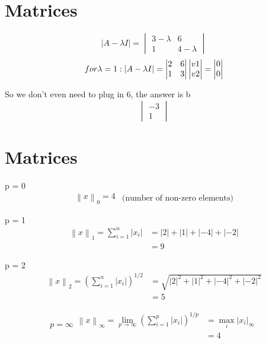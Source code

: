 \documentclass[paper=a4, fontsize=11pt]{scrartcl} %
\begin{document}
\section{Matrices}
    \[
\left | A - \lambda I \right | = \begin{vmatrix}
3-\lambda & 6\\ 
1 & 4-\lambda
\end{vmatrix}
    \]
    \[
for \space \lambda = 1:
\left | A - \lambda I \right | = \begin{vmatrix}
2 & 6\\ 
1 & 3
\end{vmatrix}
\begin{vmatrix}
v1\\
v2
\end{vmatrix}
=
\begin{vmatrix}
0\\
0
\end{vmatrix}
    \]
        
So we don't even need to plug in 6, the answer is b
    \[
\begin{vmatrix}
-3\\
1
\end{vmatrix}
    \]


\section{Matrices}

p = 0
\[
        \begin{split}
		\left \| x \right \|_0 = 4 
        \end{split}
        \begin{align*}
	        \text{(number of non-zero elements)}
        \end{align*}
\]

p = 1
\[
        \begin{split}
\left \| x \right \|_1 =  \sum_{i = 1}^{n} \left | x_i \right |
&= \left | 2 \right | + \left | 1 \right | + \left | -4 \right | + \left | -2 \right |
\\
&= 9
        \end{split}
\]

p = 2
\[
        \begin{split}
\left \| x \right \|_2 =  (\sum_{i = 1}^{n} \left | x_i \right |)^{\!1/2}
&= \sqrt{\left | 2 \right |^2 + \left | 1 \right |^2 + \left | -4 \right |^2 + \left | -2 \right |^2}
\\
&= 5
        \end{split}
\]

    \[
    p = \infty
        \begin{split}
\left \| x \right \|_\infty =  \lim_{p\to\infty}(\sum_{i = 1}^{p} \left | x_i \right |)^{\!1/p}
&= \max_{i}|x_i|_\infty
\\
&= 4
        \end{split}
    \]
\end{document}
